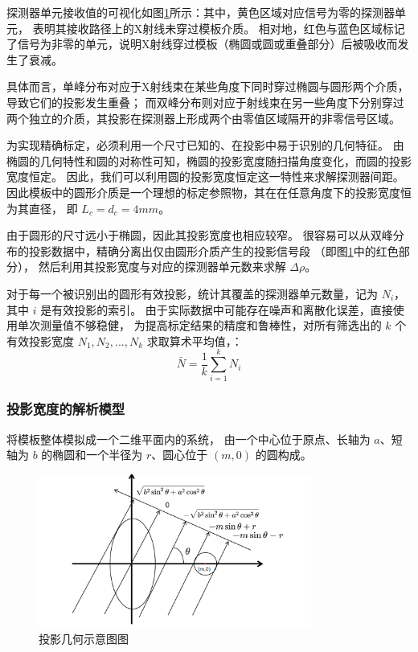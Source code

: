 探测器单元接收值的可视化如图\ref{fig:category}所示：其中，黄色区域对应信号为零的探测器单元，
表明其接收路径上的X射线未穿过模板介质。
相对地，红色与蓝色区域标记了信号为非零的单元，说明X射线穿过模板（椭圆或圆或重叠部分）后被吸收而发生了衰减。

具体而言，单峰分布对应于X射线束在某些角度下同时穿过椭圆与圆形两个介质，导致它们的投影发生重叠；
而双峰分布则对应于射线束在另一些角度下分别穿过两个独立的介质，其投影在探测器上形成两个由零值区域隔开的非零信号区域。

为实现精确标定，必须利用一个尺寸已知的、在投影中易于识别的几何特征。
由椭圆的几何特性和圆的对称性可知，椭圆的投影宽度随扫描角度变化，而圆的投影宽度恒定。
因此，我们可以利用圆的投影宽度恒定这一特性来求解探测器间距。
因此模板中的圆形介质是一个理想的标定参照物，其在在任意角度下的投影宽度恒为其直径，
即 $L_c = d_c = 4 mm$。

由于圆形的尺寸远小于椭圆，因此其投影宽度也相应较窄。
很容易可以从双峰分布的投影数据中，精确分离出仅由圆形介质产生的投影信号段
（即图\ref{fig:category}中的红色部分），
然后利用其投影宽度与对应的探测器单元数来求解 $\Delta\rho$。

对于每一个被识别出的圆形有效投影，统计其覆盖的探测器单元数量，记为 $N_i$，其中 $i$ 是有效投影的索引。
由于实际数据中可能存在噪声和离散化误差，直接使用单次测量值不够稳健，
为提高标定结果的精度和鲁棒性，对所有筛选出的 $k$ 个有效投影宽度 $N_1, N_2, ..., N_k$ 求取算术平均值，：
\begin{equation}
    \bar{N} = \frac{1}{k} \sum_{i=1}^{k} N_i
    \label{eq:average_N}
\end{equation}



\subsubsection{投影宽度的解析模型}
将模板整体模拟成一个二维平面内的系统，
由一个中心位于原点、长轴为 $a$、短轴为 $b$ 的椭圆和一个半径为 $r$、圆心位于 $(m, 0)$ 的圆构成。
\begin{figure}[h] 
    \centering 
    \includegraphics[width=0.8\textwidth]{几何图.png} 
    \caption{投影几何示意图图} 
    \label{fig:category}
\end{figure}


